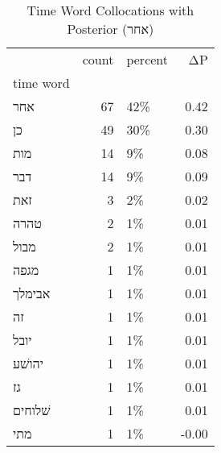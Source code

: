\begin{table}[htbp!]
\centering
\caption{Time Word Collocations with Posterior (אחר)}
\label{table:postאחר_head_cpd}
\begin{tabular}{lrlr}
\toprule
{} &  count & percent &    ΔP \\
time word &        &         &       \\
\midrule
אחר       &     67 &     42\% &  0.42 \\
כן        &     49 &     30\% &  0.30 \\
מות       &     14 &      9\% &  0.08 \\
דבר       &     14 &      9\% &  0.09 \\
זאת       &      3 &      2\% &  0.02 \\
טהרה      &      2 &      1\% &  0.01 \\
מבול      &      2 &      1\% &  0.01 \\
מגפה      &      1 &      1\% &  0.01 \\
אבימלך    &      1 &      1\% &  0.01 \\
זה        &      1 &      1\% &  0.01 \\
יובל      &      1 &      1\% &  0.01 \\
יהושׁע    &      1 &      1\% &  0.01 \\
גז        &      1 &      1\% &  0.01 \\
שׁלוחים   &      1 &      1\% &  0.01 \\
מתי       &      1 &      1\% & -0.00 \\
\bottomrule
\end{tabular}
\end{table}
